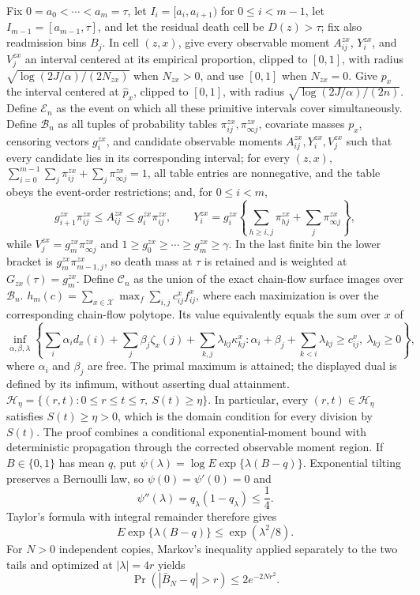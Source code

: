 Fix \(0=a_0<\cdots<a_m=\tau\), let \(I_i=[a_i,a_{i+1})\) for \(0\leq i<m-1\), let \(I_{m-1}=[a_{m-1},\tau]\), and let the residual death cell be \(D(z)>\tau\); fix also readmission bins \(B_j\).  In cell \((z,x)\), give every observable moment \(A^{zx}_{ij}\), \(Y^{zx}_i\), and \(V^{zx}_j\) an interval centered at its empirical proportion, clipped to \([0,1]\), with radius \(\sqrt{\log(2J/\alpha)/(2N_{zx})}\) when \(N_{zx}>0\), and use \([0,1]\) when \(N_{zx}=0\).  Give \(p_x\) the interval centered at \(\widehat p_x\), clipped to \([0,1]\), with radius \(\sqrt{\log(2J/\alpha)/(2n)}\).  Define \(\mathscr E_n\) as the event on which all these primitive intervals cover simultaneously.  Define \(\mathcal B_n\) as all tuples of probability tables \(\pi^{zx}_{ij},\pi^{zx}_{\infty j}\), covariate masses \(p_x\), censoring vectors \(g^{zx}_i\), and candidate observable moments \(A^{zx}_{ij},Y^{zx}_i,V^{zx}_j\) such that every candidate lies in its corresponding interval; for every \((z,x)\), \(\sum_{i=0}^{m-1}\sum_j\pi^{zx}_{ij}+\sum_j\pi^{zx}_{\infty j}=1\), all table entries are nonnegative, and the table obeys the event-order restrictions; and, for \(0\leq i<m\),
\[
g^{zx}_{i+1}\pi^{zx}_{ij}\leq A^{zx}_{ij}\leq g^{zx}_i\pi^{zx}_{ij},
\qquad
Y^{zx}_i=g^{zx}_i\left\{\sum_{h\geq i,j}\pi^{zx}_{hj}+\sum_j\pi^{zx}_{\infty j}\right\},
\]
while \(V^{zx}_j=g^{zx}_m\pi^{zx}_{\infty j}\) and \(1\geq g^{zx}_0\geq\cdots\geq g^{zx}_m\geq\gamma\).  In the last finite bin the lower bracket is \(g^{zx}_m\pi^{zx}_{m-1,j}\), so death mass at \(\tau\) is retained and is weighted at \(G_{zx}(\tau)=g^{zx}_m\).  Define \(\mathcal C_n\) as the union of the exact chain-flow surface images over \(\mathcal B_n\).
\(h_m(c)=\sum_{x\in\mathcal X}\max_f\sum_{i,j}c^x_{ij}f^x_{ij}\), where each maximization is over the corresponding chain-flow polytope.  Its value equivalently equals the sum over \(x\) of
\[
\inf_{\alpha,\beta,\lambda}
\left\{\sum_i\alpha_i d_x(i)+\sum_j\beta_j\zeta_x(j)+\sum_{k,j}\lambda_{kj}\kappa^x_{kj}:
\alpha_i+\beta_j+\sum_{k<i}\lambda_{kj}\geq c^x_{ij},\ \lambda_{kj}\geq0\right\},
\]
where \(\alpha_i\) and \(\beta_j\) are free.  The primal maximum is attained; the displayed dual is defined by its infimum, without asserting dual attainment.
\(\mathcal H_\eta=\{(r,t):0\leq r\leq t\leq\tau,\ S(t)\geq\eta\}\).  In particular, every \((r,t)\in\mathcal H_\eta\) satisfies \(S(t)\geq\eta>0\), which is the domain condition for every division by \(S(t)\).
The proof combines a conditional exponential-moment bound with deterministic propagation through the corrected observable moment region.  If \(B\in\{0,1\}\) has mean \(q\), put \(\psi(\lambda)=\log E\exp\{\lambda(B-q)\}\).  Exponential tilting preserves a Bernoulli law, so \(\psi(0)=\psi'(0)=0\) and
\[
\psi''(\lambda)=q_\lambda(1-q_\lambda)\leq\frac14.
\]
Taylor's formula with integral remainder therefore gives
\[
E\exp\{\lambda(B-q)\}\leq\exp(\lambda^2/8).
\]
For \(N>0\) independent copies, Markov's inequality applied separately to the two tails and optimized at \(|\lambda|=4r\) yields
\[
\Pr(|\bar B_N-q|>r)\leq2e^{-2Nr^2}.                                  \tag{31}
\]

